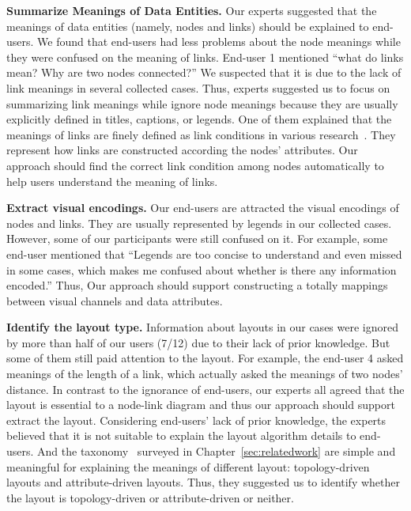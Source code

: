 \begin{compactenum}[\textbf{E}1]
    \item {\bf Summarize Meanings of Data Entities.} Our experts suggested that the meanings of data entities (namely, nodes and links) should be explained to end-users. We found that
    end-users had less problems about the node meanings while they were confused on the meaning of links. End-user 1 mentioned ``what do links mean? Why are two nodes connected?''
    We suspected that it is due to the lack of link meanings in several collected cases.
    Thus, experts suggested us to focus on summarizing link meanings while ignore node meanings because they are usually explicitly defined in titles, captions, or legends.
    One of them explained that the meanings of links are finely defined as link conditions in various research~\cite{DBLP:journals/ivs/LiuNS14, DBLP:journals/ivs/HeerP14, DBLP:journals/tvcg/SrinivasanPEB18}. They represent how links are constructed according the nodes' attributes. Our approach should find the correct link condition among nodes automatically to help users understand the meaning of links.
    
    \item {\bf Extract visual encodings.} 
    Our end-users are attracted the visual encodings of nodes and links. 
    They are usually represented by legends in our collected cases.
    However, some of our participants were still confused on it. For example, some end-user mentioned that ``Legends are too concise to understand and even missed in some cases, which makes me confused about whether is there any information encoded.''
    Thus, Our approach should support constructing a totally mappings between visual channels and data attributes.
    
    \item {\bf Identify the layout type.} 
    Information about layouts in our cases were ignored by more than half of our users (7/12) due to their lack of prior knowledge. But some of them still paid attention to the layout. For example, the end-user 4 asked meanings of the length of a link, which actually asked the meanings of two nodes' distance.
    In contrast to the ignorance of end-users, our experts all agreed that the layout is essential to a node-link diagram and thus our approach should support extract the layout.
    Considering end-users' lack of prior knowledge, the experts believed that it is not suitable to explain the layout algorithm details to end-users. And the taxonomy~\cite{DBLP:journals/cgf/NobreMSL19} surveyed in Chapter~\ref{sec:relatedwork} are simple and meaningful for explaining the meanings of different layout: topology-driven layouts and attribute-driven layouts. Thus, they suggested us to identify whether the layout is topology-driven or attribute-driven or neither.
    

\end{compactenum}
